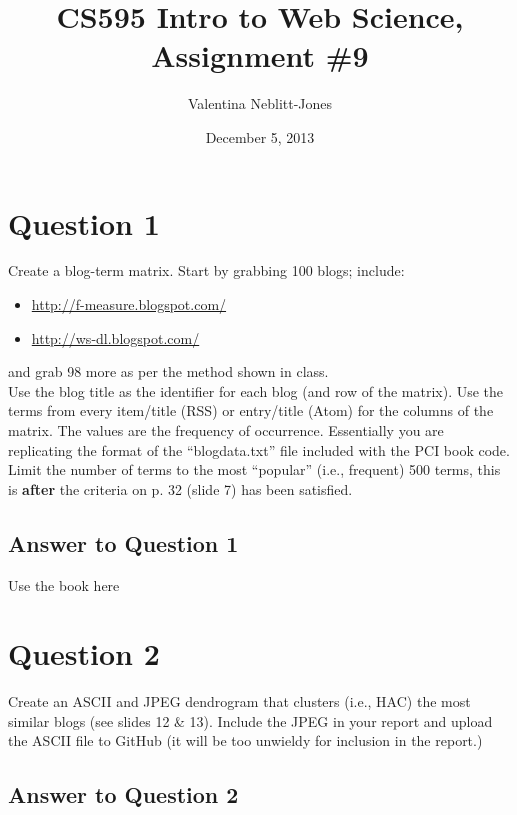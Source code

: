 \documentclass{article}
\begin{document}
\title{CS595 Intro to Web Science, Assignment \#9}
\author{Valentina Neblitt-Jones}
\date{December 5, 2013}
\maketitle

\newpage
\listoftables
\lstlistoflistings
\listoffigures

\newpage
\section*{Question 1}

Create a blog-term matrix. Start by grabbing 100 blogs; include: \\

\begin{itemize}
\item \url{http://f-measure.blogspot.com/}
\item \url{http://ws-dl.blogspot.com/}
\end{itemize}

and grab 98 more as per the method shown in class. \\

Use the blog title as the identifier for each blog (and row of the matrix). Use the terms from every item/title (RSS) or entry/title (Atom) for the columns of the matrix. The values are the frequency of occurrence. Essentially you are replicating the format of the ``blogdata.txt'' file included with the PCI book code. Limit the number of terms to the most ``popular'' (i.e., frequent) 500 terms, this is \textbf{after} the criteria on p. 32 (slide 7) has been satisfied.

\subsection*{Answer to Question 1}
Use the book here \cite{pci}

\newpage
\section*{Question 2}
Create an ASCII and JPEG dendrogram that clusters (i.e., HAC) the most similar blogs (see slides 12 \& 13). Include the JPEG in your report and upload the ASCII file to GitHub (it will be too unwieldy for inclusion in the report.)

\subsection*{Answer to Question 2}
\end{document}
